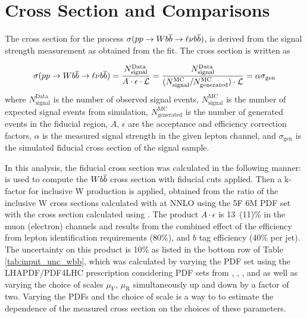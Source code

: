 \FloatBarrier

\section{Cross Section and Comparisons}

The cross section for the process
 $\sigma(pp\rightarrow Wb\overline{b}\rightarrow\ell\nu b\overline{b})$,
 is derived from the signal strength measurement as obtained from the fit.
The cross section is written as

$$\sigma(pp\rightarrow Wb\overline{b}\rightarrow\ell\nu b\overline{b}) = 
\frac{N^{\mathrm{Data}}_{\mathrm{signal}}}{A\cdot\epsilon\cdot \mathcal{L}} = 
\frac{N^{\mathrm{Data}}_{\mathrm{signal}}}{(N^{\mathrm{MC}}_{\mathrm{signal}}/N^{\mathrm{MC}}_{\mathrm{generated}})\cdot \mathcal{L}} =
\alpha \sigma_{\mathrm{gen}}$$
 where
 $N^{\mathrm{Data}}_{\mathrm{signal}}$ is the number of observed signal events,
 $N^{\mathrm{MC}}_{\mathrm{signal}}$ is the number of expected signal events from simulation,
 $N^{\mathrm{MC}}_{\mathrm{generated}}$ is the number of generated events in the fiducial region,
 $A$, $\epsilon$ are the acceptance and efficiency correction factors,
 $\alpha$ is the measured signal strength in the given lepton channel, and
 $\sigma_{\mathrm{gen}}$ is the simulated fiducial cross section of the signal sample.

In this analysis, the fiducial cross section was calculated in the following manner:
 \MADGRAPH is used to compute the $W b\overline{b}$ cross section with fiducial cuts applied.
Then a k-factor for inclusive W production is applied, obtained from the ratio
of the inclusive W cross sections calculated with \FEWZ at NNLO using the 5F 
\CTEQ6M PDF set with the cross section calculated using  \MADGRAPH.
The product $A\cdot\epsilon$ is 13~(11)\% in the
 muon (electron) channels and results from the
 combined effect of the efficiency from
 lepton identification requirements (80\%), and $b$ tag efficiency (40\% per jet).
The uncertainty on this product is 10\% as listed in the bottom row of
 Table \ref{tab:input_unc_wbb}, which was calculated by varying the PDF
 set using the LHAPDF/PDF4LHC \cite{LHAPDF,Botje:2011sn,Alekhin:2011sk,Ball:2012cx}
 prescription considering
 PDF sets from \CTEQ, \MSTW, \NNPDF, and \HERA
 as well as varying the
 choice of scales
 $\mu_{\mathrm{F}}$, $\mu_{\mathrm{R}}$ simultaneously
 up and down by a factor of two.
Varying the PDFs and the choice of scale is a way to 
 to estimate the dependence of the measured cross section on the 
 choices of these parameters.
 

